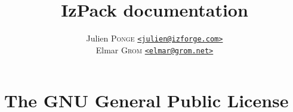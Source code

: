 \documentclass[a4paper, 12pt, pdftex]{report}
\title{\Huge{\textbf{IzPack documentation}}}
\author{Julien \textsc{Ponge} \href{mailto:julien@izforge.com}{\texttt{<julien@izforge.com>}} \\
        Elmar \textsc{Grom} \href{mailto:elmar@grom.net}{\texttt{<elmar@grom.net>}}}
\begin{document}
  \maketitle
  \tableofcontents

  
  
  
  
  
  
  

  \appendix
  \chapter{The GNU General Public License}
  \footnotesize
  
  \normalsize
\end{document}

